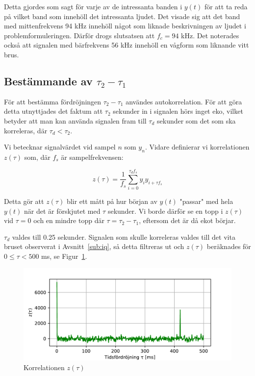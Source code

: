 \documentclass[10pt,twocolumn]{article}
\begin{document}
Detta gjordes som sagt för varje av de intressanta banden i $y(t)$ för att ta
reda på vilket band som innehöll det intressanta ljudet. Det visade sig att det
band med mittenfrekvens 94 kHz innehöll något som liknade beskrivningen av
ljudet i problemformuleringen. Därför drogs slutsatsen att $f_c = 94$ kHz.
Det noterades också att signalen med bärfrekvens 56 kHz innehöll en vågform som
liknande vitt brus.

\subsection{Bestämmande av $\tau_2 - \tau_1$}
För att bestämma fördröjningen $\tau_2 - \tau_1$ användes autokorrelation. För
att göra detta utnyttjades det faktum att $\tau_2$ sekunder in i signalen
hörs inget eko, vilket betyder att man kan använda signalen fram till $\tau_d$
sekunder som det som ska korreleras, där $\tau_d < \tau_2$.

Vi betecknar signalvärdet vid sampel $n$ som $y_n$. Vidare definierar vi korrelationen
$z(\tau)$ som, där $f_s$ är sampelfrekvensen:

\begin{equation*}
    z(\tau) = \frac{1}{f_s}\sum_{i=0}^{\tau_d f_s}y_iy_{i + \tau f_s}
\end{equation*}

Detta gör att $z(\tau)$ blir ett mått på hur början av $y(t)$ 
"passar" med hela $y(t)$ när det är förskjutet med $\tau$ sekunder. Vi
borde därför se en topp i $z(\tau)$ vid $\tau = 0$ och en mindre topp där $\tau
= \tau_2 - \tau_1$, eftersom det är då ekot börjar.

$\tau_d$ valdes till 0.25 sekunder. Signalen som skulle korreleras valdes till det
vita bruset observerat i Avsnitt~\ref{sub:iq}, så detta filtreras ut och
$z(\tau)$ beräknades för $0 \leq \tau < 500$ ms, se Figur~\ref{fig:corr}.

\begin{figure}[h]
    \centering
    \includegraphics[width=0.8\linewidth]{figures/corr.pdf}
    \caption{Korrelationen $z(\tau)$}
    \label{fig:corr}
\end{figure}
\end{document}
